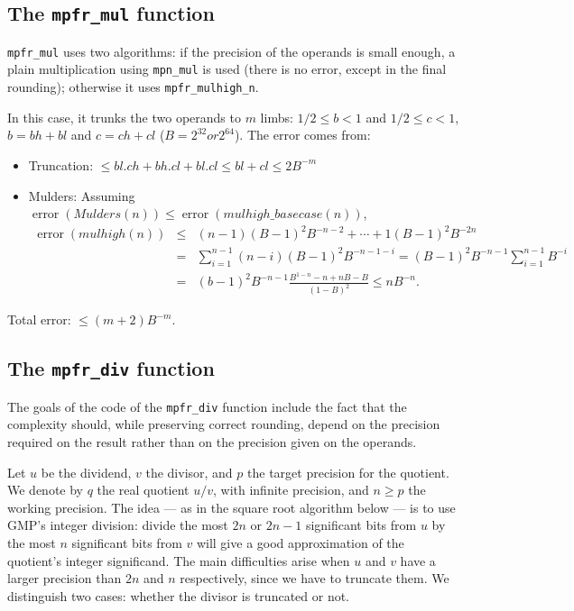 \documentclass[12pt]{amsart}
\DeclareMathOperator{\error}{error}
\begin{document}
\subsection{The {\tt mpfr\_mul} function}

{\tt mpfr\_mul} uses two algorithms: if the precision of the operands
is small enough, a plain multiplication using {\tt mpn\_mul} is used
(there is no error, except in the final rounding);
otherwise it uses {\tt mpfr\_mulhigh\_n}.

In this case, it trunks the two operands to $m$ limbs:
$1/2 \leq b < 1$ and $1/2 \leq c < 1$, $b = bh+bl$ and $c = ch+cl$
($B=2^{32} or 2^{64}$).
The error comes from:
\begin {itemize}
\item Truncation: $ \leq bl.ch + bh.cl + bl.cl \leq bl + cl \leq 2 B^{-m}$
\item Mulders: Assuming $\error(Mulders(n)) \leq \error(mulhigh\_basecase(n))$,
\begin{eqnarray*}
\error(mulhigh(n))
  & \leq & (n-1) (B-1)^2 B^{-n-2} + \cdots + 1 (B-1)^2 B^{-2n} \\
  & = & \sum_{i=1}^{n-1}{(n-i) (B-1)^2 B^{-n-1-i}}
    =   (B-1)^2 B^{-n-1} \sum_{i=1}^{n-1}{B^{-i}} \\
  & = & (b-1)^2 B^{-n-1} \frac{B^{1-n}-n+n B-B}{(1-B)^2} \leq n B^{-n}.
\end{eqnarray*}
\end {itemize}
Total error: $\leq (m+2) B^{-m}$.

\subsection{The {\tt mpfr\_div} function}

The goals of the code of the {\tt mpfr\_div} function include the fact
that the complexity should, while preserving correct
rounding, depend on the precision required on the result rather than
on the precision given on the operands.

Let $u$ be the dividend, $v$ the divisor, and $p$ the target precision
for the quotient. We denote by $q$ the real quotient $u/v$, with infinite
precision, and $n \geq p$ the working precision.
The idea --- as in the square root algorithm below --- is to use GMP's
integer division: divide the most $2n$ or $2n-1$ significant bits from $u$ by
the most $n$ significant bits from $v$ will give a good approximation of
the quotient's integer significand.
The main difficulties arise when $u$ and $v$ have a larger precision than
$2n$ and $n$ respectively, since we have to truncate them.
We distinguish two cases: whether the divisor is truncated or not.
\end{document}
